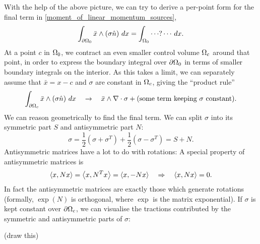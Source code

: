 With the help of the above picture, we can try to derive a per-point form for the final term in \eqref{moment_of_linear_momentum_sources},
\begin{align*}
    \int_{{\partial\Omega_0}} \bar{x} \wedge \left(\sigma\hat{n}\right)\,dx = \int_{\Omega_0}\cdots ? \cdots\,dx.
\end{align*}
At a point $c$ in ${\Omega_0}$, we contract an even smaller control volume ${\Omega}_c$ around that point, in order to express
the boundary integral over ${\partial\Omega_0}$ in terms of smaller boundary integrals on the interior. As this takes a limit,
we can separately assume that $\bar{x} = x - c$ and $\sigma$ are constant in ${\Omega}_c$, giving the ``product rule''
\begin{align*}
    \int_{{\partial\Omega}_c} \bar{x}\wedge\left(\sigma\hat{n}\right)\,dx \quad\rightarrow\quad
    \bar{x}\wedge \nabla\cdot \sigma + \text{(some term keeping $\sigma$ constant)}.
\end{align*}
We can reason geometrically to find the final term. We can split $\sigma$ into its symmetric part $S$ and antisymmetric part $N$:
    $$\sigma = \frac{1}{2}\left(\sigma + \sigma^T\right) + \frac{1}{2}\left(\sigma - \sigma^T\right) = S + N.$$
Antisymmetric matrices have a lot to do with rotations: A special property of antisymmetric matrices is
    $$\left<x, Nx\right> = \left<x, N^Tx\right> = \left<x, -Nx\right> \quad\Rightarrow\quad \left<x, Nx\right> = 0.$$
In fact the antisymmetric matrices are exactly those which generate rotations (formally, $\exp(N)$ is orthogonal, where $\exp$ is the matrix
exponential). If $\sigma$ is kept constant over ${\partial\Omega}_c$, we can visualise the tractions contributed by the symmetric and antisymmetric parts of $\sigma$:

\vskip 0.2in
(draw this)
\vskip 0.2in

